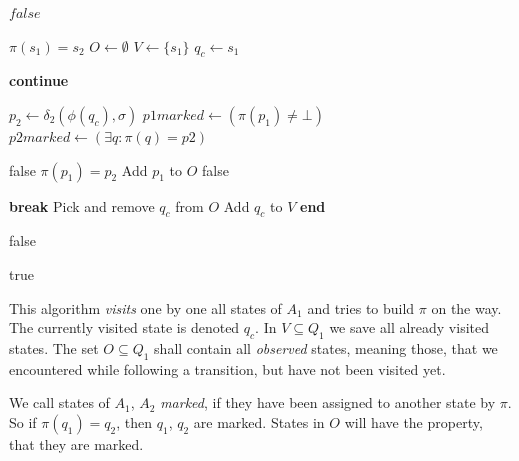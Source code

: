 \begin{algorithmic}[1]
			\State \Return $false$
		\EndIf
		
		\State $\pi(s_1) = s_2$ 
		\State $O \gets \emptyset$ 
		\State $V \gets \{s_1\}$ 
		\State $q_c \gets s_1$ 
		
			 
					\State \textbf{continue}
				\EndIf
				
				\State
				
				\State $p_2 \gets \delta_2(\phi(q_c), \sigma)$ 
				\State $p1marked \gets (\pi(p_1) \neq \bot)$ 
				\State $p2marked \gets (\exists q\colon \pi(q)=p2)$
				
				\State
				
						\State \Return false
					\EndIf
					\State $\pi(p_1) = p_2$
						\State Add $p_1$ to $O$
					\EndIf
				\Else {}
					\State \Return false
				\EndIf
			\EndFor	
			
				\State \textbf{break}
			\EndIf
			\State Pick and remove $q_c$ from $O$
			\State Add $q_c$ to $V$
		\EndWhile
		\State\textbf{end}
		
				\State \Return false
			\EndIf
		\EndFor	
		
		\State \Return true
	\EndFunction
\end{algorithmic}
\vspace{0.2cm}
This algorithm \emph{visits} one by one all states of $A_1$ and tries to build $\pi$ on the way. The currently visited state is denoted $q_c$. In $V \subseteq Q_1$ we save all already visited states. The set $O \subseteq Q_1$ shall contain all \emph{observed} states, meaning those, that we encountered while following a transition, but have not been visited yet.

We call states of $A_1$, $A_2$ \emph{marked}, if they have been assigned to another state by $\pi$. So if $\pi(q_1)=q_2$, then $q_1$, $q_2$ are marked. States in $O$ will have the property, that they are marked.

